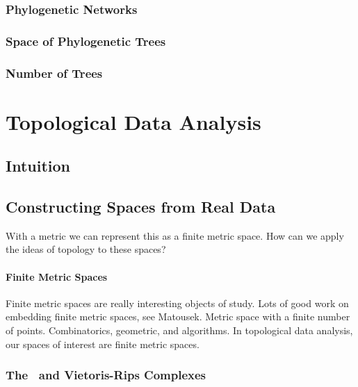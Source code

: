 \subsubsection{Phylogenetic Networks}

\subsubsection{Space of Phylogenetic Trees}

\subsubsection{Number of Trees}



\section{Topological Data Analysis}

\subsection{Intuition}

\subsection{Constructing Spaces from Real Data}

With a metric we can represent this as a finite metric space.
How can we apply the ideas of topology to these spaces?

\paragraph{Finite Metric Spaces}

Finite metric spaces are really interesting objects of study.
Lots of good work on embedding finite metric spaces, see Matousek.
Metric space with a finite number of points.
Combinatorics, geometric, and algorithms.
In topological data analysis, our spaces of interest are finite metric spaces.

\subsubsection{The \Cech\ and Vietoris-Rips Complexes}

